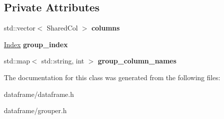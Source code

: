 \subsection*{Private Attributes}
\begin{DoxyCompactItemize}
\item 
\mbox{\label{classDataFrame_1_1Grouper_a5198033bdc8e86d981d5224d6b74b188}} 
std\+::vector$<$ Shared\+Col $>$ {\bfseries columns}
\item 
\mbox{\label{classDataFrame_1_1Grouper_a4168b1377cc1d6453b90398911f39f15}} 
\hyperlink{classIndex}{Index} {\bfseries group\+\_\+index}
\item 
\mbox{\label{classDataFrame_1_1Grouper_a3cdb08226e82c7f54b14ebc1b0609684}} 
std\+::map$<$ std\+::string, int $>$ {\bfseries group\+\_\+column\+\_\+names}
\end{DoxyCompactItemize}


The documentation for this class was generated from the following files\+:\begin{DoxyCompactItemize}
\item 
dataframe/dataframe.\+h\item 
dataframe/grouper.\+h\end{DoxyCompactItemize}
